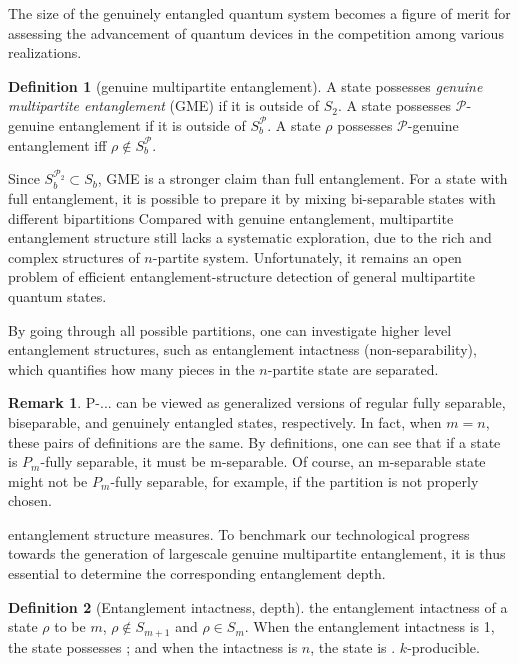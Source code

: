 \documentclass[
10pt,
aps,
pra,
linenumbers,
floatfix,
]{revtex4-2}
\theoremstyle{plain}
\theoremstyle{definition}
\newtheorem{definition}{Definition}
\newtheorem{observation}{Observation}
\newtheorem{remark}{Remark}
\newcommand{\ppartition}{\mathcal{P}}
\newcommand{\dm}{\rho}
\begin{document}
The size of the genuinely entangled quantum system becomes a figure of merit for assessing the advancement of quantum devices in the competition among various realizations.
\begin{definition}[genuine multipartite entanglement]\label{def:gme}
	A state possesses \emph{genuine multipartite entanglement} (GME) if it is outside of $S_2$.
	A state possesses $\ppartition$-genuine entanglement if it is outside of $S_b^\ppartition$.
	A state $\dm$ possesses $\ppartition$-genuine entanglement iff $\dm\notin S_b^\ppartition$.
\end{definition}
Since $S_b^{\ppartition_2}\subset S_b$, GME is a stronger claim than full entanglement. 
For a state with full entanglement, it is possible to prepare it by mixing bi-separable states with different bipartitions
	Compared with genuine entanglement, multipartite entanglement structure still lacks a systematic exploration, due to the rich and complex structures of $n$-partite system.
	Unfortunately, it remains an open problem of efficient entanglement-structure detection of general multipartite quantum states.

By going through all possible partitions, one can investigate higher level entanglement structures, such as entanglement intactness (non-separability), which quantifies how many pieces in the $n$-partite state are separated.

\begin{remark}
	P-... can be viewed as generalized versions of regular fully separable, biseparable, and genuinely entangled states, respectively.
	In fact, when $m=n$, these pairs of definitions are the same.
	By definitions, one can see that if a state is $P_m$-fully separable, it must be m-separable. Of course, an m-separable state might not be $P_m$-fully separable, for example, if the partition is not properly chosen.
\end{remark}
entanglement structure measures.
To benchmark our technological progress towards the generation of largescale genuine multipartite entanglement, it is thus essential to determine the corresponding entanglement depth.
\begin{definition}[Entanglement intactness, depth]
	the entanglement intactness of a state $\dm$ to be $m$, \iff $\dm\notin S_{m+1}$ and $\dm\in S_m$.
	When the entanglement intactness is 1, the state possesses ; and when the intactness is $n$, the state is .
	$k$-producible.
\end{definition}
\end{document}
